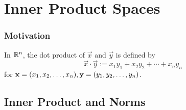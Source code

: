 \section{Inner Product Spaces}
\subsubsection*{Motivation}
\begin{definition}
    In $\mathbb R^n$, the dot product of $\vec x$ and $\vec y$ is defined by  
\[ \vec x \cdot \vec y := x_1y_1 + x_2y_2 + \cdots + x_ny_n\]
for $\mathbf x = ({x}_1,{x}_2, \ldots, {x}_{n}), \mathbf y = ({y}_1,{y}_2, \ldots, {y}_{n})$.
\end{definition}
\subsection{Inner Product and Norms}
